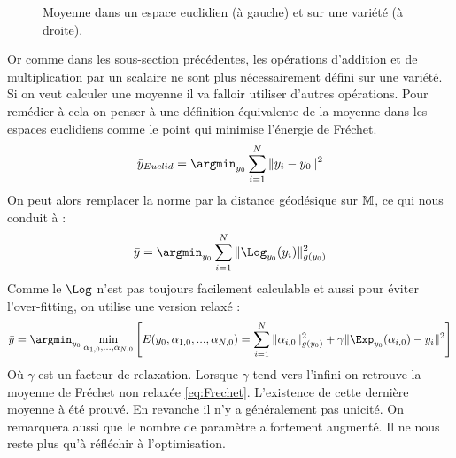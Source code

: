 \begin{figure}[b]
	\caption{Moyenne dans un espace euclidien (à gauche) et sur une variété (à droite).}
\end{figure}
Or comme dans les sous-section précédentes, les opérations d'addition et de multiplication par un scalaire ne sont plus nécessairement défini sur une variété. Si on veut calculer une moyenne il va falloir utiliser d'autres opérations. Pour remédier à cela on penser à une définition équivalente de la moyenne dans les espaces euclidiens comme le point qui minimise l'énergie de Fréchet.
\begin{equation}
	\bar{y}_{Euclid} = \argmin_{y_0} \sum_{i=1}^N \| y_i - y_0 \|^2
\end{equation}
On peut alors remplacer la norme par la distance géodésique sur $\mathbb{M}$, ce qui nous conduit à :
\begin{equation}
	\label{eq:Frechet}
	\bar{y} = \argmin_{y_0} \sum_{i=1}^N \| \Log_{y_0}(y_i) \|_{g(y_0)}^2
\end{equation}
Comme le $\Log$ n'est pas toujours facilement calculable et aussi pour éviter l'over-fitting, on utilise une version relaxé :
\begin{equation}
	\bar{y} = \argmin_{y_0} \min_{\alpha_{1,0}, ..., \alpha_{N,0}} \left[ E(y_0, \alpha_{1,0}, ..., \alpha_{N,0}) =  \sum_{i=1}^N \| \alpha_{i,0} \|_{g(y_0)}^2 + \gamma \| \Exp_{y_0}(\alpha_{i,0}) - y_i \|^2 \right]
\end{equation}
Où $\gamma$ est un facteur de relaxation. Lorsque $\gamma$ tend vers l'infini on retrouve la moyenne de Fréchet non relaxée \eqref{eq:Frechet}. L'existence de cette dernière moyenne à été prouvé. En revanche il n'y a généralement pas unicité. On remarquera aussi que le nombre de paramètre a fortement augmenté. Il ne nous reste plus qu'à réfléchir à l'optimisation.
